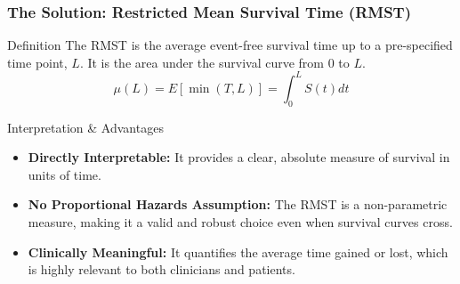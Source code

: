 \documentclass{beamer}
\begin{document}
\begin{frame}
\frametitle{The Solution: Restricted Mean Survival Time (RMST)}
\begin{block}{Definition}
The RMST is the average event-free survival time up to a pre-specified time point, $L$. It is the area under the survival curve from 0 to $L$.
$$\mu(L) = E[\min(T, L)] = \int_0^L S(t) dt$$
\end{block}

\begin{block}{Interpretation \& Advantages}
\begin{itemize}
    \item \textbf{Directly Interpretable:} It provides a clear, absolute measure of survival in units of time.
    \item \textbf{No Proportional Hazards Assumption:} The RMST is a non-parametric measure, making it a valid and robust choice even when survival curves cross.
    \item \textbf{Clinically Meaningful:} It quantifies the average time gained or lost, which is highly relevant to both clinicians and patients.
\end{itemize}
\end{block}
\end{frame}

\end{document}
